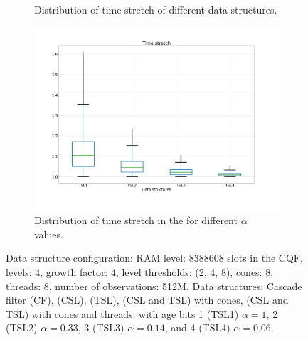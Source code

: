 \begin{figure}
{\begin{subfigure}{.33\textwidth}
  \captionsetup{margin=.5cm}
  \caption{Distribution of time stretch of different
  data structures.}
  \label{fig:timestretch}
\end{subfigure}
%
\begin{subfigure}{.33\textwidth}
  \centering
  \includegraphics[width=\linewidth]{../LERT-src/sigmod20_figs/timestretch-a-dist.png}
  \captionsetup{margin=.5cm}
  \caption{Distribution of time stretch in the \ts for
  different \boldmath  $\alpha$ values.}
  \label{fig:timeliness-timestretch}
\end{subfigure}
%
}
\caption{\boldmath Data structure configuration: RAM level: 8388608 slots in
    the CQF, levels: 4, growth factor: 4, level thresholds: (2, 4, 8), cones: 8, threads: 8, number of
  observations: 512M.
%
  Data structures: Cascade filter (CF), \cs (CSL),
  \ts (TSL), (CSL and TSL) with cones, (CSL and TSL) with cones and threads.
  \Ts with age bits 1 (TSL1) $\alpha=1$, 2 (TSL2) $\alpha=0.33$, 3 (TSL3)
  $\alpha=0.14$, and 4 (TSL4) $\alpha=0.06$.
} 
\label{fig:timeliness}
\end{figure}

